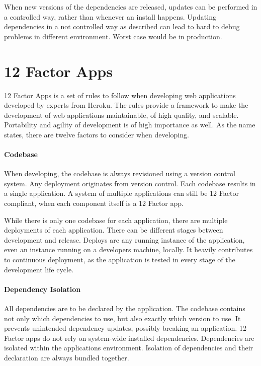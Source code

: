 When new versions of the dependencies are released, updates can be performed in
a controlled way, rather than whenever an install happens. Updating
dependencies in a not controlled way as described can lead to hard to debug
problems in different environment. Worst case would be in production.
\cite{dependency_locking}

\section{12 Factor Apps}

12 Factor Apps is a set of rules to follow when developing web applications
developed by experts from Heroku. The rules provide a framework to make the
development of web applications maintainable, of high quality, and scalable.
Portability and agility of development is of high importance as well. As the
name states, there are twelve factors to consider when developing.

\paragraph{Codebase}

When developing, the codebase is always revisioned using a version control
system. Any deployment originates from version control. Each codebase results
in a single application. A system of multiple applications can still be 12
Factor compliant, when each component itself is a 12 Factor app.

While there is only one codebase for each application, there are multiple
deployments of each application. There can be different stages between
development and release. Deploys are any running instance of the application,
even an instance running on a developers machine, locally. It heavily
contributes to continuous deployment, as the application is tested in every
stage of the development life cycle.

\paragraph{Dependency Isolation}

All dependencies are to be declared by the application. The codebase contains
not only which dependencies to use, but also exactly which version to use. It
prevents unintended dependency updates, possibly breaking an application. 12
Factor apps do not rely on system-wide installed dependencies. Dependencies are
isolated within the applications environment. Isolation of dependencies and
their declaration are always bundled together.

